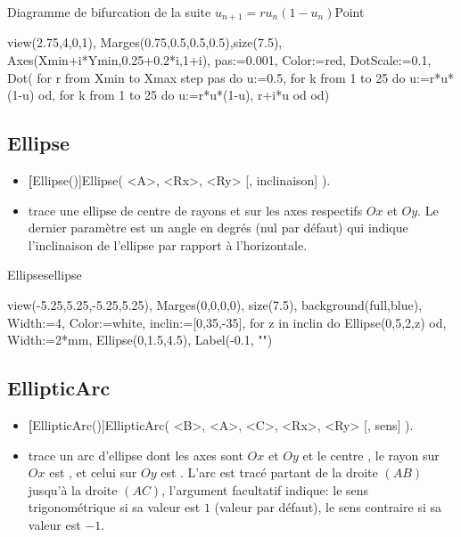 \pngtrue
\begin{demo}{Diagramme de bifurcation de la suite $u_{n+1}=ru_n(1-u_n)$}{Point}
\begin{texgraph}[name=Point,export=none]
view(2.75,4,0,1),
Marges(0.75,0.5,0.5,0.5),size(7.5),
Axes(Xmin+i*Ymin,0.25+0.2*i,1+i),
pas:=0.001, Color:=red,
DotScale:=0.1,
Dot(
 for r from Xmin to Xmax step pas do
 u:=0.5,
 for k from 1 to 25 do u:=r*u*(1-u) od,
 for k from 1 to 25 do u:=r*u*(1-u), r+i*u od
 od)
\end{texgraph}
\end{demo}
\pngfalse

\subsection{Ellipse}\label{cmdEllipse}
\begin{itemize}
 \item \util \textbf[Ellipse()]{Ellipse( <A>, <Rx>, <Ry> [, inclinaison] )}.
 \item \desc trace une ellipse de centre  de rayons  et  sur les axes respectifs $Ox$ et $Oy$. Le dernier paramètre  est un angle en degrés (nul par défaut) qui indique l'inclinaison de l'ellipse par rapport à l'horizontale.
\end{itemize}

\begin{demo}{Ellipses}{ellipse}
\begin{texgraph}[name=ellipse]
view(-5.25,5.25,-5.25,5.25), Marges(0,0,0,0), size(7.5),
background(full,blue), Width:=4, Color:=white,
inclin:=[0,35,-35],
for z in inclin do
 Ellipse(0,5,2,z)
od,
Width:=2*mm, Ellipse(0,1.5,4.5),
Label(-0.1, "")
\end{texgraph}
\end{demo}

\subsection{EllipticArc}\label{cmdEllipticArc}
\begin{itemize}
 \item \util \textbf[EllipticArc()]{EllipticArc( <B>, <A>, <C>, <Rx>, <Ry> [, sens] )}.
 \item \desc trace un arc d'ellipse dont les axes sont $Ox$ et $Oy$ et le centre ,  le rayon sur $Ox$ est , et celui sur $Oy$ est . L'arc est tracé partant de la droite $(AB)$ jusqu'à la droite $(AC)$, l'argument facultatif  indique: le sens trigonométrique si sa valeur est $1$ (valeur par défaut), le sens contraire si sa valeur est $-1$. 
\end{itemize}

